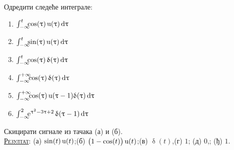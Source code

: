 \noindent
\PID Одредити следеће интеграле: 
\begin{multicols}{3}
\begin{enumerate}[label=(\alph*)]
\item $\int_{-\infty}^t \hspace*{-0.5em}
\cos (\uptau)\,{\rm u}(\uptau)\,{\rm d}\uptau$
\item $\int_{-\infty}^t \hspace*{-0.5em}
\sin (\uptau)\,{\rm u}(\uptau)\,{\rm d}\uptau$
\item $\int_{-\infty}^t \hspace*{-0.5em}
\cos (\uptau)\,\updelta(\uptau)\,{\rm d}\uptau$
\item $\int_{-\infty}^{+\infty} \hspace*{-0.5em}
\cos (\uptau)\,\updelta(\uptau)\,{\rm d}\uptau$
\item $\int_{-\infty}^{+\infty} \hspace*{-0.5em}
\cos (\uptau)\,{\rm u}(\uptau-1)\updelta(\uptau)\,{\rm d}\uptau$
\item $\int_{-\infty}^{2}
 \hspace*{-0.5em}
{\rm e}^{\uptau^2 - 3\uptau + 2} \, \updelta(\uptau-1) \,{\rm d}\uptau$
\end{enumerate}
\end{multicols}
\noindent
Скицирати сигнале из тачака (а) и (б).
\\[2mm]

\textsc{\underline{Резултат}}:
(а) $\sin(t)\,{\rm u}(t)$;\hfill (б) $\bigl(1 - \cos(t)\bigr)\,{\rm u}(t)$;\hfill (в) $\updelta (t)$,\hfill (г) $1$;\hfill 
(д) $0$,\hfill; (ђ) $1$.
